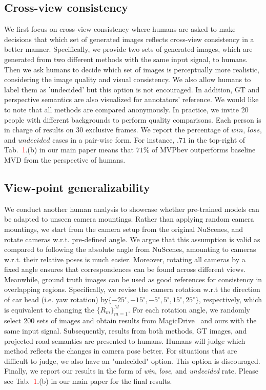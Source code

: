 \documentclass[sigconf]{acmart}
\begin{document}
\subsection{Cross-view consistency}
We first focus on cross-view consistency where humans are asked to make decisions that which set of generated images reflects cross-view consistency in a better manner. Specifically, we provide two sets of generated images, which are generated from two different methods with the same input signal, to humans. Then we ask humans to decide which set of images is perceptually more realistic, considering the image quality and visual consistency. We also allow humans to label them as 'undecided' but this option is not encouraged. In addition, GT and perspective semantics are also visualized for annotators' reference. We would like to note that all methods are compared anonymously. In practice, we invite 20 people with different backgrounds to perform quality comparisons. Each person is in charge of results on 30 exclusive frames. We report the percentage of $win$, $loss$, and $undecided$ cases in a pair-wise form. For instance, $.71$ in the top-right of Tab.~\textcolor{red}{1}.(b) in our main paper means that $71\%$ of MVPbev outperforms baseline MVD from the perspective of humans. 
\subsection{View-point generalizability}
We conduct another human analysis to showcase whether pre-trained models can be adapted to unseen camera mountings. Rather than applying random camera mountings, we start from the camera setup from the original NuScenes, and rotate cameras w.r.t. pre-defined angle. We argue that this assumption is valid as compared to following the absolute angle from NuScenes, amounting to cameras w.r.t. their relative poses is much easier. %
Moreover, rotating all cameras by a fixed angle ensures that correspondences can be found across different views. Meanwhile, ground truth images can be used as good references for consistency in overlapping regions. 
Specifically, we revise the camera rotation w.r.t the direction of car head (i.e. yaw rotation) by$\{-25^{\circ}, -15^{\circ},-5^{\circ},5^{\circ},15^{\circ}, 25^{\circ}\}$, respectively, which is equivalent to changing the $\{R_m\}_{m=1}^M$. For each rotation angle, we randomly select 200 sets of images and obtain results from MagicDrive~\cite{gao2023magicdrive} and ours with the same input signal. Subsequently, results from both methods, GT images, and projected road semantics are presented to humans. Humans will judge which method reflects the changes in camera pose better. For situations that are difficult to judge, we also have an "undecided" option. This option is discouraged. Finally, we report our results in the form of \textit{win}, \textit{lose}, and \textit{undecided} rate. Please see Tab.~\textcolor{red}{1}.(b) in our main paper for the final results.
\end{document}
